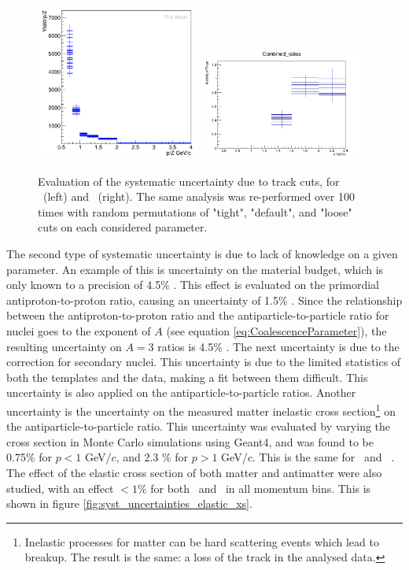 \begin{figure}
    \centering
    \includegraphics[width=0.48\textwidth]{figures/he3_tracking_systematics.png}
    \includegraphics[width=0.48\textwidth]{figures/triton/Systematics_tritons.png}
    \caption{Evaluation of the systematic uncertainty due to track cuts, for \ahe\ (left) and \atrit\ (right). The same analysis was re-performed over 100 times with random permutations of "tight", "default", and "loose" cuts on each considered parameter.}
    \label{fig:TrackingSystematics}
\end{figure}

The second type of systematic uncertainty is due to lack of knowledge on a given parameter. An example of this is uncertainty on the material budget, which is only known to a precision of 4.5\% . This effect is evaluated on the primordial antiproton-to-proton ratio, causing an uncertainty of 1.5\% . Since the relationship between the  antiproton-to-proton ratio and the antiparticle-to-particle ratio for nuclei goes to the exponent of $A$ (see equation \ref{eq:CoalescenceParameter}), the resulting uncertainty on $A=3$ ratios is 4.5\% . The next uncertainty is due to the correction for secondary nuclei. This uncertainty is due to the limited statistics of both the templates and the data, making a fit between them difficult. This uncertainty is also applied on the antiparticle-to-particle ratios. Another uncertainty is the uncertainty on the measured matter inelastic cross section\footnote{Inelastic processes for matter can be hard scattering events which lead to breakup. The result is the same: a loss of the track in the analysed data.} on the antiparticle-to-particle ratio. This uncertainty was evaluated by varying the cross section in Monte Carlo simulations using Geant4, and was found to be 0.75\% for $p<1$ GeV/$c$, and 2.3 \% for $p>1$ GeV/$c$. This is the same for \ahe\ and \atrit\ . The effect of the elastic cross section of both matter and antimatter were also studied, with an effect $< 1$\% for both \ahe\ and \atrit\ in all momentum bins. This is shown in figure \ref{fig:syst_uncertainties_elastic_xs}. \\

